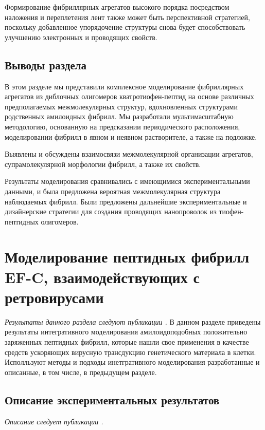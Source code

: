     Формирование фибриллярных агрегатов высокого порядка посредством наложения и переплетения лент также может быть перспективной стратегией, поскольку добавленное упорядочение структуры снова будет способствовать улучшению электронных и проводящих свойств.
    
\subsection{Выводы раздела}
    
    В этом разделе мы представили комплексное моделирование фибриллярных агрегатов из диблочных олигомеров кватротиофен-пептид на основе различных предполагаемых межмолекулярных структур, вдохновленных структурами родственных амилоидных фибрилл. Мы разработали мультимасштабную методологию, основанную на предсказании периодического расположения, моделировании фибрилл в явном и неявном растворителе, а также на подложке.

    Выявлены и обсуждены взаимосвязи межмолекулярной организации агрегатов, супрамолекулярной морфологии фибрилл, а также их свойств.

    Результаты моделирования сравнивались с имеющимися экспериментальными данными, и была предложена вероятная межмолекулярная структура наблюдаемых фибрилл. Были предложены дальнейшие экспериментальные и дизайнерские стратегии для создания проводящих нанопроволок из тиофен-пептидных олигомеров.
    
    
    




\section{Моделирование пептидных фибрилл EF-C, взаимодействующих с ретровирусами}
\textit{Результаты данного раздела следуют публикации \cite{yolamanova_peptide_2013}.} В данном разделе приведены результаты интегративного моделирования амилоидоподобных положительно заряженных пептидных фибрилл, которые нашли свое применения в качестве средств ускоряющих вирусную трансдукцию генетического материала в клетки. Исполльзуют методы и подходы инетгративного моделирования разработанные и описанные, в том числе, в предыдущем разделе.

\subsection{Описание экспериментальных результатов}
\textit{Описание следует публикации \cite{yolamanova_peptide_2013}.}


